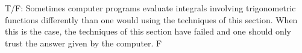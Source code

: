 {T/F: Sometimes computer programs evaluate integrals involving trigonometric functions differently than one would using the techniques of this section. When this is the case, the techniques of this section have failed and one should only trust the answer given by the computer.}
{F}
